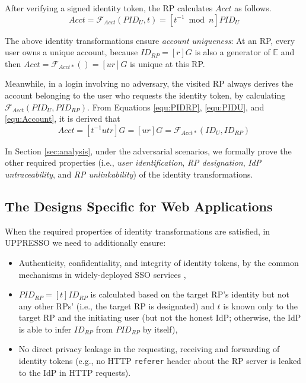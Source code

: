 
After verifying a signed identity token, the RP calculates $Acct$ as follows.
\begin{equation}
Acct = \mathcal{F}_{Acct}(PID_{U},t)
   = [t^{-1} \bmod n]PID_{U}
   \label{equ:Account}
\end{equation}

The above identity transformations ensure \emph{account uniqueness}:
    At an RP, every user owns a unique account, because $ID_{RP} = [r]G$ is also a generator of $\mathbb{E}$ and then
     $Acct = \mathcal{F}_{Acct\ast}()=[ur]G$ is unique at this RP.

Meanwhile, in a login involving no adversary,
 the visited RP always derives the account belonging to the user who requests the identity token,
    by calculating $\mathcal{F}_{Acct}(PID_{U}, PID_{RP})$.
From Equations \ref{equ:PIDRP}, \ref{equ:PIDU}, and \ref{equ:Account}, it is derived that
\begin{equation}
   Acct =  [t^{-1}utr]G = [ur]G = \mathcal{F}_{Acct\ast}(ID_U, ID_{RP})
   \label{equ:AccountNotChanged}
\end{equation}


In Section \ref{sec:analysis},
    under the adversarial scenarios, we formally prove the other required properties (i.e.,
    \emph{user identification}, \emph{RP designation}, \emph{IdP untraceability}, and \emph{RP unlinkability}) of the identity transformations.

\subsection{The Designs Specific for Web Applications}
\label{sec:web-design}

When the required properties of identity transformations are satisfied,
    in UPPRESSO we need to additionally ensure:
\begin{itemize}
  \item Authenticity, confidentiality, and integrity of identity tokens,
  by the common mechanisms in widely-deployed SSO services \cite{OpenIDConnect, rfc6749, SAML,GoogleIdIntegrate,de2014oauth,FettKS14,BrowserID,uber},
  \item $PID_{RP} = [t]{ID_{RP}}$ is calculated based on the target RP's identity but not any other RPs' (i.e., the target RP is designated) and $t$ is known only to the target RP and the initiating user (but not the honest IdP; otherwise, the IdP is able to infer $ID_{RP}$ from $PID_{RP}$ by itself),
  \item 
No direct privacy leakage in the requesting, receiving and forwarding of identity tokens
(e.g., no HTTP \texttt{referer} header about the RP server is leaked to the IdP in HTTP requests).
\end{itemize}

